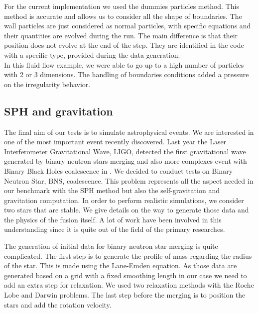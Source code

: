 For the current implementation we used the dummies particles method.
This method is accurate and allows us to consider all the shape of boundaries.
The wall particles are just considered as normal particles, with specific equations and their quantities are evolved during the run. 
The main difference is that their position does not evolve at the end of the step.
They are identified in the code with a specific type, provided during the data generation.\\ 

In this fluid flow example, we were able to go up to a high number of particles with 2 or 3 dimensions. 
The handling of boundaries conditions added a pressure on the irregularity behavior. 

\subsection{SPH and gravitation}

The final aim of our tests is to simulate astrophysical events. 
We are interested in one of the most important event recently discovered. 
Last year the Laser Interferometer Gravitational Wave, LIGO, detected the first gravitational wave generated by binary neutron stars merging \cite{abbott2017gw170817} and also more complexes event with Binary Black Holes coalescence in \cite{abbott2017gw170814}.
We decided to conduct tests on Binary Neutron Star, BNS, coalescence. 
This problem represents all the aspect needed in our benchmark with the SPH method but also the self-gravitation and gravitation computation. 
In order to perform realistic simulations, we consider two stars that are stable. 
We give details on the way to generate those data and the physics of the fusion itself. 
A lot of work have been involved in this understanding since it is quite out of the field of the primary researches. 

The generation of initial data for binary neutron star merging is quite complicated. 
The first step is to generate the profile of mass regarding the radius of the star. 
This is made using the Lane-Emden equation. 
As those data are generated based on a grid with a fixed smoothing length in our case we need to add an extra step for relaxation. 
We used two relaxation methods with the Roche Lobe and Darwin problems. 
The last step before the merging is to position the stars and add the rotation velocity. 

